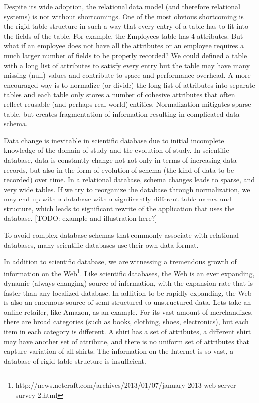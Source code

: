 Despite its wide adoption, the relational data model (and therefore relational systems) is not without shortcomings. One of the most obvious shortcoming is the rigid table structure in such a way that every entry of a table has to fit into the fields of the table. For example, the Employees table has 4 attributes. But what if an employee does not have all the attributes or an employee requires a much larger number of fields to be properly recorded? We could defined a table with a long list of attributes to satisfy every entry but the table may have many missing (null) values and contribute to space and performance overhead\cite{DBLP:conf/icde/BeckmannHKN06}. A more encouraged way is to normalize \cite{DBLP:journals/cacm/Codd70} (or divide) the long list of attributes into separate tables and each table only stores a number of cohesive attributes that often reflect reusable (and perhaps real-world) entities. Normalization mitigates sparse table, but creates fragmentation of information resulting in complicated data schema\cite{DBLP:conf/sigmod/ChuBN07}.

Data change is inevitable in scientific database due to initial incomplete knowledge of the domain of study and the evolution of study. In scientific database, data is constantly change not not only in terms of increasing data records, but also in the form of evolution of schema (the kind of data to be recorded) over time. In a relational database, schema changes leads to sparse, and very wide tables. If we try to reorganize the database through normalization, we may end up with a database with a significantly different table names and structure, which leads to significant rewrite of the application that uses the database. [TODO: example and illustration here?]

To avoid complex database schemas that commonly associate with relational databases, many scientific databases use their own data format.

In addition to scientific database, we are witnessing a tremendous growth of information on the Web\footnote{http://news.netcraft.com/archives/2013/01/07/january-2013-web-server-survey-2.html}. Like scientific databases, the Web is an ever expanding, dynamic (always changing) source of information, with the expansion rate that is faster than any localized database. In addition to be rapidly expanding, the Web is also an enormous source of semi-structured to unstructured data. Lets take an online retailer, like Amazon, as an example. For its vast amount of merchandizes, there are broad categories (such as books, clothing, shoes, electronics), but each item in each category is different. A shirt has a set of attributes, a different shirt may have another set of attribute, and there is no uniform set of attributes that capture variation of all shirts. The information on the Internet is so vast, a database of rigid table structure is insufficient.

